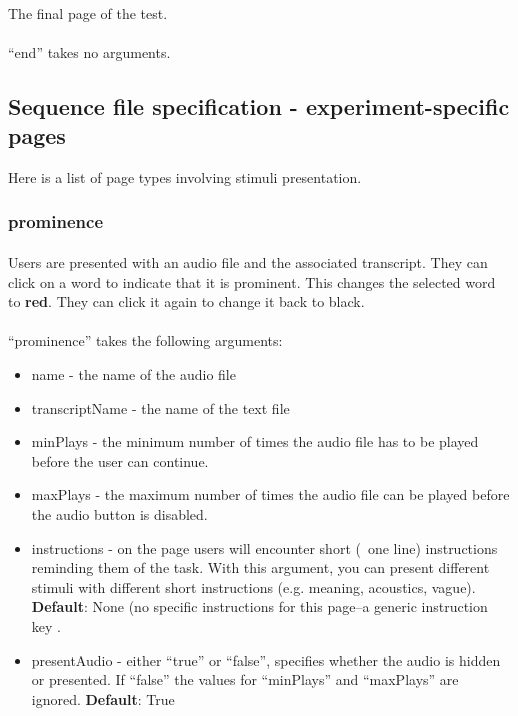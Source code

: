 \documentclass[12pt, oneside]{scrbook}   	%
\begin{document}
\paragraph{}
The final page of the test.  

\paragraph{}
``end'' takes no arguments.

\subsection{Sequence file specification - experiment-specific pages}
\label{sec:sequenceSpecSpecific}

Here is a list of page types involving stimuli presentation.  

\subsubsection{prominence}

\paragraph{}
Users are presented with an audio file and the associated transcript.  They can click on a word to indicate that it is prominent.  This changes the selected word to \textbf{red}.  They can click it again to change it back to black.

\paragraph{}
``prominence'' takes the following arguments:

\begin{itemize}
\item name - the name of the audio file
\item transcriptName - the name of the text file
\item minPlays - the minimum number of times the audio file has to be played before the user can continue.
\item maxPlays - the maximum number of times the audio file can be played before the audio button is disabled. 
\item instructions - on the page users will encounter short (~one line) instructions reminding them of the task.  With this argument, you can present different stimuli with different short instructions (e.g. meaning, acoustics, vague).  \textbf{Default}: None (no specific instructions for this page--a generic instruction key .
\item presentAudio - either ``true'' or ``false'', specifies whether the audio is hidden or presented.  If ``false'' the values for ``minPlays'' and ``maxPlays'' are ignored. \textbf{Default}: True
\end{itemize}
\end{document}
